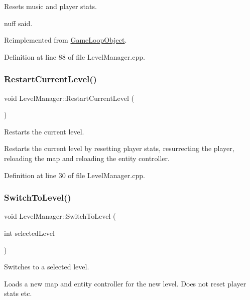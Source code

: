 Resets music and player stats. 

\textquotesingle{}nuff said. 

Reimplemented from \hyperlink{class_game_loop_object_af61e973be170cb9437a5b7d9ecd6ef53}{Game\+Loop\+Object}.



Definition at line 88 of file Level\+Manager.\+cpp.

\mbox{\label{class_level_manager_abdd9fde4c4a21da8cb315e9c3a29120a}} 
\subsubsection{\texorpdfstring{Restart\+Current\+Level()}{RestartCurrentLevel()}}
{\footnotesize\ttfamily void Level\+Manager\+::\+Restart\+Current\+Level (\begin{DoxyParamCaption}{ }\end{DoxyParamCaption})}



Restarts the current level. 

Restarts the current level by resetting player stats, resurrecting the player, reloading the map and reloading the entity controller. 

Definition at line 30 of file Level\+Manager.\+cpp.

\mbox{\label{class_level_manager_a9c892f8066fa089d7bbc665696bf37c4}} 
\subsubsection{\texorpdfstring{Switch\+To\+Level()}{SwitchToLevel()}}
{\footnotesize\ttfamily void Level\+Manager\+::\+Switch\+To\+Level (\begin{DoxyParamCaption}\item[{int}]{selected\+Level }\end{DoxyParamCaption})}



Switches to a selected level. 

Loads a new map and entity controller for the new level. Does not reset player stats etc. 

